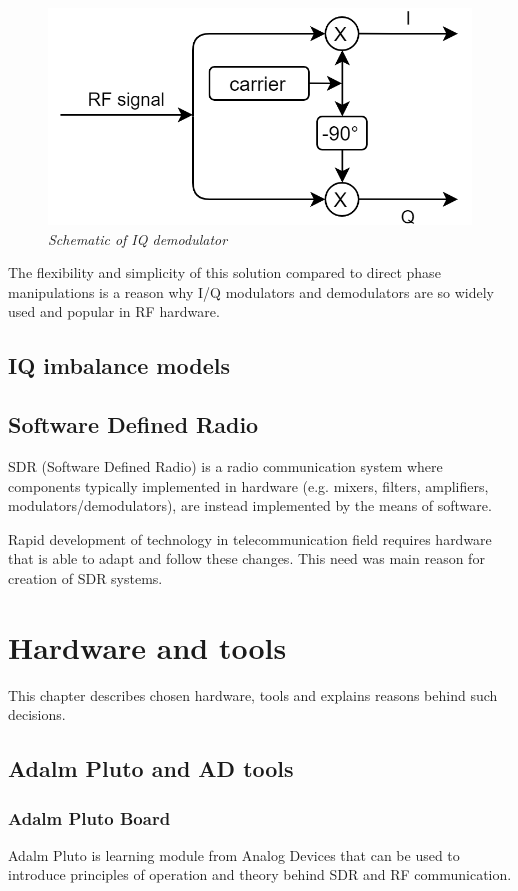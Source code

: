 \documentclass[en,printmode]{mgr}
\begin{document}
		\begin{figure}[!htb]
    		\centering
   			\includegraphics[width=\textwidth]{images/iqdemod.png}
    		\caption{\textit{Schematic of IQ demodulator}}
    		\label{fig:polarplot}
		\end{figure}
		\newpage
		The flexibility and simplicity of this solution compared to direct phase manipulations
		is a reason why I/Q modulators and demodulators are so widely used and popular in RF hardware.
		

	\section{IQ imbalance models}
	\section{Software Defined Radio}
		SDR (Software Defined Radio) is a radio communication system where components typically implemented in hardware 
		(e.g. mixers, filters, amplifiers, modulators/demodulators), are instead implemented by the means of software.
		
		Rapid development of technology in telecommunication field requires hardware that is able to adapt and follow these changes. 
		This need was main reason for creation of SDR systems. 
		
		
\chapter{Hardware and tools}
	This chapter describes chosen hardware, tools and explains reasons behind such decisions.
	\section{Adalm Pluto and AD tools}
		\subsection*{Adalm Pluto Board}
			Adalm Pluto is learning module from Analog Devices that can be used to introduce 
			principles of operation and theory behind SDR and RF communication.
			
\end{document}
